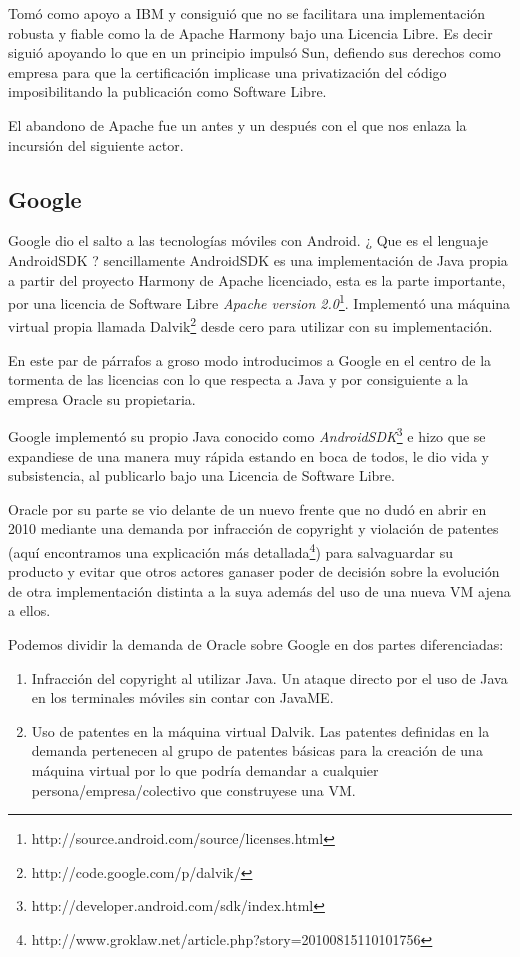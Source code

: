 \documentclass[11pt]{scrartcl}
\begin{document}
Tomó como apoyo a IBM y consiguió que no se facilitara una implementación robusta y fiable como la de Apache Harmony bajo una Licencia Libre. Es decir siguió apoyando lo que en un principio impulsó Sun, defiendo sus derechos como empresa para que la certificación implicase una privatización del código imposibilitando la publicación como Software Libre.

El abandono de Apache fue un antes y un después con el que nos enlaza la incursión del siguiente actor.

\subsection{Google}

Google dio el salto a las tecnologías móviles con Android. ¿ Que es el lenguaje AndroidSDK ? sencillamente AndroidSDK es una implementación de Java propia a partir del proyecto Harmony de Apache licenciado, esta es la parte importante, por una licencia de Software Libre \emph{Apache version 2.0}\footnote{http://source.android.com/source/licenses.html}. Implementó una máquina virtual propia llamada Dalvik\footnote{http://code.google.com/p/dalvik/} desde cero para utilizar con su implementación.

En este par de párrafos a groso modo introducimos a Google en el centro de la tormenta de las licencias con lo que respecta a Java y por consiguiente a la empresa Oracle su propietaria.

Google implementó su propio Java conocido como \emph{AndroidSDK}\footnote{http://developer.android.com/sdk/index.html} e hizo que se expandiese de una manera muy rápida estando en boca de todos, le dio vida y subsistencia, al publicarlo bajo una Licencia de Software Libre.

Oracle por su parte se vio delante de un nuevo frente que no dudó en abrir en 2010 mediante una demanda por infracción de copyright y violación de patentes (aquí encontramos una explicación más detallada\footnote{http://www.groklaw.net/article.php?story=20100815110101756}) para salvaguardar su producto y evitar que otros actores ganaser poder de decisión sobre la evolución de otra implementación distinta a la suya además del uso de una nueva VM ajena a ellos.

Podemos dividir la demanda de Oracle sobre Google en dos partes diferenciadas:
\begin{enumerate}
    \item Infracción del copyright al utilizar Java. Un ataque directo por el uso de Java en los terminales móviles sin contar con JavaME.
    \item Uso de patentes en la máquina virtual Dalvik. Las patentes definidas en la demanda pertenecen al grupo de patentes básicas para la creación de una máquina virtual por lo que podría demandar a cualquier persona/empresa/colectivo que construyese una VM.
\end{enumerate}
\end{document}
